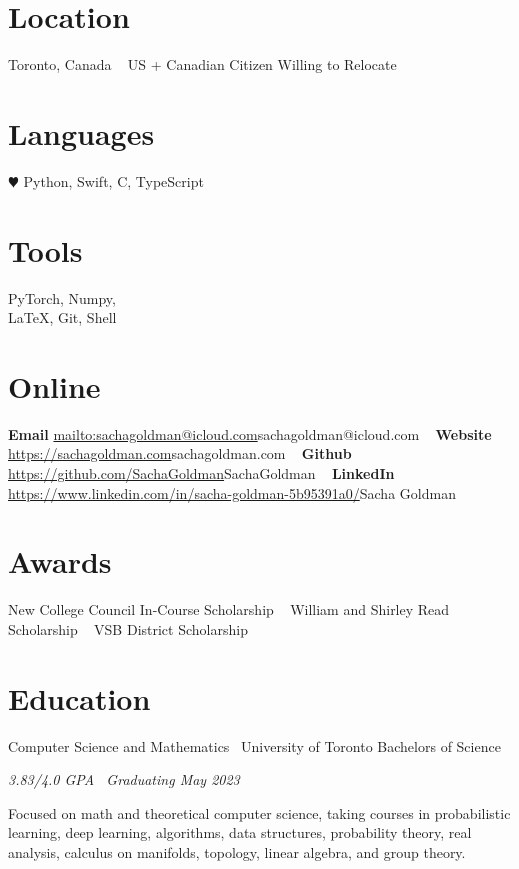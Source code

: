 \documentclass[]{style}
\begin{document}

\begin{aside} %
\section{Location}
Toronto, Canada
~ \vspace{-2mm}
US + Canadian Citizen 
Willing to Relocate
\section{Languages}
{\color{red} $\varheartsuit$} Python, Swift, 
C, TypeScript
\section{Tools}
PyTorch, Numpy, \\ \LaTeX, Git, Shell
\section{Online}
\textbf{Email}
\url{mailto:sachagoldman@icloud.com}{sachagoldman@icloud.com} 
~ \vspace{-2mm}
\textbf{Website} 
\url{https://sachagoldman.com}{sachagoldman.com} 
~ \vspace{-2mm}
\textbf{Github}
\url{https://github.com/SachaGoldman}{SachaGoldman}
~ \vspace{-2mm}
\textbf{LinkedIn}
\url{https://www.linkedin.com/in/sacha-goldman-5b95391a0/}{Sacha Goldman}
\section{Awards}
New College Council 
In-Course Scholarship
~ \vspace{-1mm}
William and Shirley Read 
Scholarship
~ \vspace{-1mm}
VSB District Scholarship
\end{aside}

\section{Education}

\begin{entrylist}

\entry
{Computer Science and Mathematics \ {\normalfont University of Toronto}}
{Bachelors of Science}
{\emph{3.83/4.0 GPA \ Graduating May 2023}
~ \vspace{1mm}

Focused on math and theoretical computer science, taking courses in probabilistic learning, deep learning, algorithms, data structures, probability theory, real analysis, calculus on manifolds, topology, linear algebra, and group theory.}

\end{entrylist}
\end{document}
